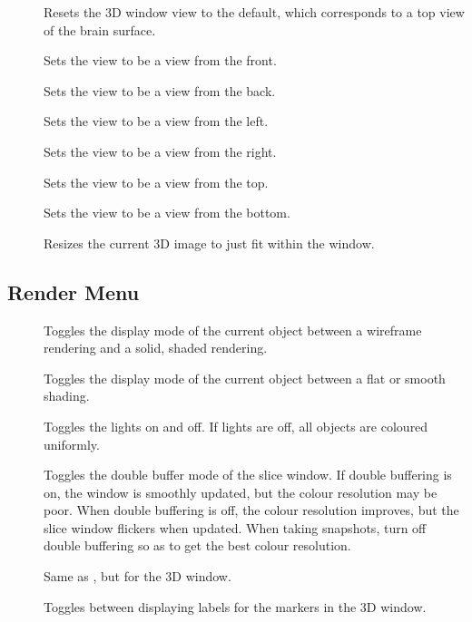 \begin{description}
\item[]  Resets the 3D window view to the default,
        which corresponds to a top view of the brain surface.
\item[]  Sets the view to be a view from the front.
\item[]  Sets the view to be a view from the back.
\item[]  Sets the view to be a view from the left.
\item[]  Sets the view to be a view from the right.
\item[]  Sets the view to be a view from the top.
\item[]  Sets the view to be a view from the bottom.
\item[]  Resizes the current 3D image to just fit
                                 within the window.
\end{description}

\subsection{Render Menu}

\begin{description}
\item[]  Toggles the display mode of the
        current object between a wireframe rendering and a solid, shaded 
        rendering.
\item[]  Toggles the display mode of the
        current object between a flat or smooth shading.
\item[]  Toggles the lights on and off.  If lights
        are off, all objects are coloured uniformly.
\item[]  Toggles the double buffer mode of the
        slice window.  If double buffering is on, the window is smoothly
        updated, but the colour resolution may be poor.
        When double buffering is off, the colour resolution improves, but
        the slice window flickers when updated.  When taking snapshots,
        turn off double buffering so as to get the best colour resolution.
\item[]  Same as ,
        but for the 3D window.
\item[]  Toggles between displaying labels
        for the markers in the 3D window.
\end{description}

